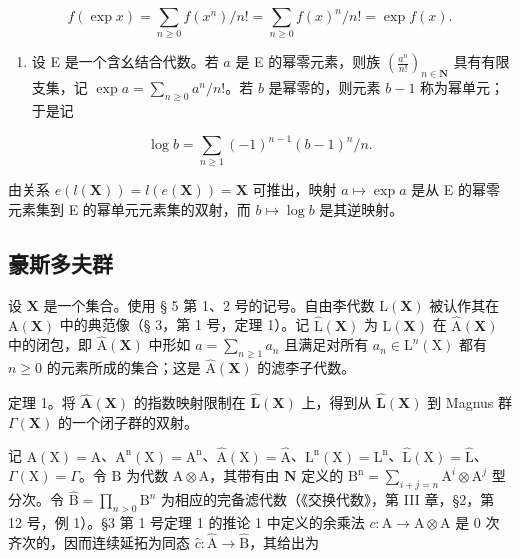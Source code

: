 \[
f (\exp x) = \sum_ {n \geqslant 0} f (x ^ {n}) / n! = \sum_ {n \geqslant 0} f (x) ^ {n} / n! = \exp f (x).
\]

\begin{enumerate}
\def\labelenumi{(\arabic{enumi})}
\setcounter{enumi}{3}
\tightlist
\item
  设 E 是一个含幺结合代数。若 \(a\) 是 E 的幂零元素，则族 \(\left(\frac{a^n}{n!}\right)_{n\in \mathbf{N}}\) 具有有限支集，记 \(\exp a = \sum_{n\geqslant 0}a^n /n!\)。若 \(b\) 是幂零的，则元素 \(b - 1\) 称为幂单元；于是记
\end{enumerate}

\[
\log b = \sum_ {n \geqslant 1} (- 1) ^ {n - 1} (b - 1) ^ {n} / n.
\]

由关系 \(e(l(\mathbf{X})) = l(e(\mathbf{X})) = \mathbf{X}\) 可推出，映射 \(a \mapsto \exp a\) 是从 E 的幂零元素集到 E 的幂单元元素集的双射，而 \(b \mapsto \log b\) 是其逆映射。

\subsection{豪斯多夫群}

设 \(\mathbf{X}\) 是一个集合。使用 § 5 第 1、2 号的记号。自由李代数 \(\mathrm{L}(\mathbf{X})\) 被认作其在 \(\mathrm{A}(\mathbf{X})\) 中的典范像（§ 3，第 1 号，定理 1）。记 \(\hat{\mathrm{L}}(\mathbf{X})\) 为 \(\mathrm{L}(\mathbf{X})\) 在 \(\hat{\mathrm{A}}(\mathbf{X})\) 中的闭包，即 \(\hat{\mathrm{A}}(\mathbf{X})\) 中形如 \(a = \sum_{n\geqslant 1}a_n\) 且满足对所有 \(a_{n}\in \mathrm{L}^{n}(\mathrm{X})\) 都有 \(n\geqslant 0\) 的元素所成的集合；这是 \(\hat{\mathrm{A}}(\mathbf{X})\) 的滤李子代数。

定理 1。将 \(\hat{\mathbf{A}}(\mathbf{X})\) 的指数映射限制在 \(\hat{\mathbf{L}}(\mathbf{X})\) 上，得到从 \(\hat{\mathbf{L}}(\mathbf{X})\) 到 Magnus 群 \(\Gamma(\mathbf{X})\) 的一个闭子群的双射。

记 \(\mathrm{A}(\mathrm{X}) = \mathrm{A}\)、\(\mathrm{A}^{\mathrm{n}}(\mathrm{X}) = \mathrm{A}^{\mathrm{n}}\)、\(\hat{\mathrm{A}}(\mathrm{X}) = \hat{\mathrm{A}}\)、\(\mathrm{L}^{\mathrm{n}}(\mathrm{X}) = \mathrm{L}^{\mathrm{n}}\)、\(\hat{\mathrm{L}}(\mathrm{X}) = \hat{\mathrm{L}}\)、\(\Gamma(\mathrm{X}) = \Gamma\)。令 \(\mathrm{B}\) 为代数 \(\mathrm{A} \otimes \mathrm{A}\)，其带有由 \(\mathbf{N}\) 定义的 \(\mathrm{B}^{\mathrm{n}} = \sum_{i+j=n} \mathrm{A}^{i} \otimes \mathrm{A}^{j}\) 型分次。令 \(\hat{\mathrm{B}} = \prod_{n > 0} \mathrm{B}^{n}\) 为相应的完备滤代数（《交换代数》，第 III 章，§2，第 12 号，例 1）。§3 第 1 号定理 1 的推论 1 中定义的余乘法 \(c: \mathrm{A} \to \mathrm{A} \otimes \mathrm{A}\) 是 0 次齐次的，因而连续延拓为同态 \(\hat c: \hat{\mathrm{A}} \to \hat{\mathrm{B}}\)，其给出为

